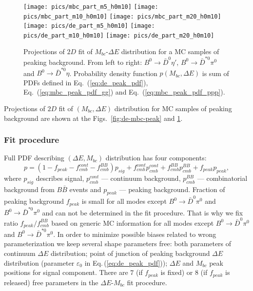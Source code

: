 \documentclass[preprint,aps,showpacs]{revtex4}
\newcommand{\bdpi}{\ensuremath{B^0\to \bar D^0\pi^0}\xspace}
\newcommand{\bdetap}{\ensuremath{B^0\to \bar D^0\eta\prime}\xspace}
\newcommand{\btodstpi}{\ensuremath{B^0\to \bar D^{*0}\pi^0}\xspace}
\newcommand{\btodsteta}{\ensuremath{B^0\to \bar D^{*0}\eta}\xspace}
\newcommand{\de}{\ensuremath{\Delta E}\xspace}
\newcommand{\mbc}{\ensuremath{M_{bc}}\xspace}
\begin{document}
\begin{figure}[htb]
 \texttt{[image: pics/mbc\_part\_m5\_h0m10]}
 \texttt{[image: pics/mbc\_part\_m10\_h0m10]}
 \texttt{[image: pics/mbc\_part\_m20\_h0m10]}\\
 \texttt{[image: pics/de\_part\_m5\_h0m10]}
 \texttt{[image: pics/de\_part\_m10\_h0m10]}
 \texttt{[image: pics/de\_part\_m20\_h0m10]}
 \caption{Projections of $2D$ fit of \mbc-\de distribution for a MC samples of peaking  background. From left to right: \bdetap, \btodstpi and \btodsteta. Probability density function $p(\mbc,\de)$ is sum of PDFs defined in Eq.~(\ref{eq:de_peak_pdf}), Eq.~(\ref{eq:mbc_peak_pdf_gg}) and Eq.~(\ref{eq:mbc_peak_pdf_ppp}).}
\label{fig:de-mbc-peak-prime-star}
\end{figure}

Projections of $2D$ fit of $(\mbc,\de)$ distribution for MC samples of peaking background are shown at the Figs.~\ref{fig:de-mbc-peak} and \ref{fig:de-mbc-peak-prime-star}.

\clearpage
\subsubsection{Fit procedure}\label{sec:de-mbc-fit-procedure}
Full PDF describing $(\de,\mbc)$ distribution has four components:
\begin{equation}
 p = (1-f_{peak}-f_{cmb}^{cont}-f_{cmb}^{BB})p_{sig}+f_{cmb}^{cont}p_{cmb}^{cont}+f_{cmb}^{BB}p_{cmb}^{BB}+f_{peak}p_{peak},
\end{equation}
where $p_{sig}$ describes signal, $p_{cmb}^{cont}$ --- continuum background, $p_{cmb}^{BB}$ --- combinatorial background from $B\bar B$ events and $p_{peak}$ --- peaking background. Fraction of peaking background $f_{peak}$ is small for all modes except \bdpi and \btodstpi and can not be determined in the fit procedure. That is why we fix ratio $f_{peak}/f_{cmb}^{BB}$ based on generic MC information for all modes except \bdpi and \btodstpi. In order to minimize possible biases related to wrong parameterization we keep several shape parameters free: both parameters of continuum \de distribution; point of junction of peaking background \de distribution (parameter $\varepsilon_0$ in Eq.\,(\ref{eq:de_peak_pdf})); \de and \mbc peak positions for signal component. There are $7$ (if $f_{peak}$ is fixed) or $8$ (if $f_{peak}$ is released) free parameters in the \de-\mbc fit procedure.
\end{document}

